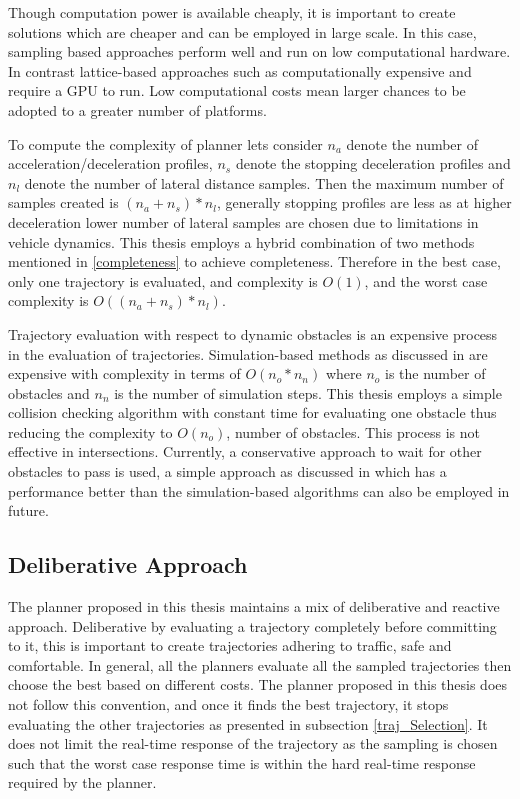 Though computation power is available cheaply, it is important to create solutions which are cheaper and can be employed in large scale. In this case, sampling based approaches perform well and run on low computational hardware. In contrast lattice-based approaches such as \cite{cmu_parallel_thesis} \cite{diss_shui_phd_thesis} \cite{werling_frenet} computationally expensive and require a GPU to run. Low computational costs mean larger chances to be adopted to a greater number of platforms.

To compute the complexity of planner lets consider $n_a$ denote the number of acceleration/deceleration profiles, $n_s$ denote the stopping deceleration profiles and $n_l$ denote the number of lateral distance samples. Then the maximum number of samples created is $(n_a+n_s)*n_l$, generally stopping profiles are less as at higher deceleration lower number of lateral samples are chosen due to limitations in vehicle dynamics. This thesis employs a hybrid combination of two methods mentioned in \ref{completeness} to achieve completeness. Therefore in the best case, only one trajectory is evaluated, and complexity is $O(1)$, and the worst case complexity is $O((n_a+n_s)*n_l)$.

Trajectory evaluation with respect to dynamic obstacles is an expensive process in the evaluation of trajectories. Simulation-based methods as discussed in  \cite{kolski_thesis} are expensive with complexity in terms of $O(n_o*n_n)$ where $n_o$ is the number of obstacles and $n_n$ is the number of simulation steps. This thesis employs a simple collision checking algorithm with constant time for evaluating one obstacle thus reducing the complexity to $O(n_o)$, number of obstacles. This process is not effective in intersections. Currently, a conservative approach to wait for other obstacles to pass is used, a simple approach as discussed in \cite{rrt_star} which has a performance better than the simulation-based algorithms can also be employed in future.  


\subsection{Deliberative Approach}
The planner proposed in this thesis maintains a mix of deliberative and reactive approach. Deliberative by evaluating a trajectory completely before committing to it, this is important to create trajectories adhering to traffic, safe and comfortable. In general, all the planners evaluate all the sampled trajectories then choose the best based on different costs. The planner proposed in this thesis does not follow this convention, and once it finds the best trajectory, it stops evaluating the other trajectories as presented in subsection \ref{traj_Selection}. It does not limit the real-time response of the trajectory as the sampling is chosen such that the worst case response time is within the hard real-time response required by the planner. 

